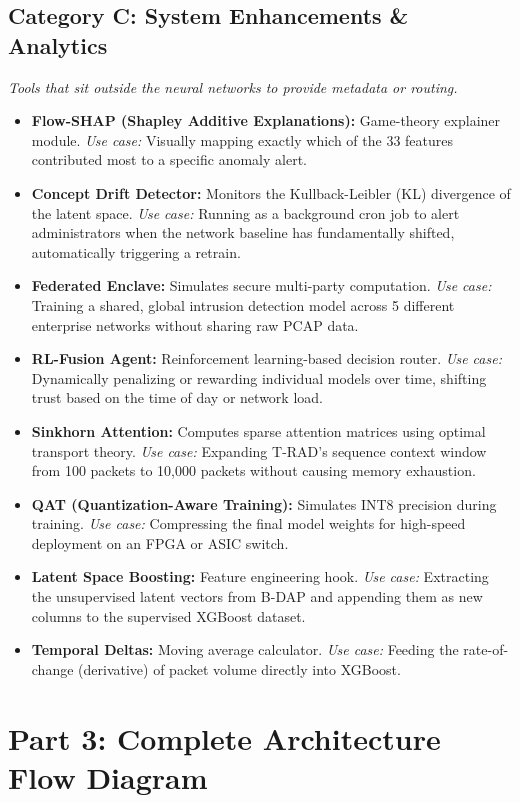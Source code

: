 \documentclass[11pt,a4paper]{article}
\begin{document}
\subsection{Category C: System Enhancements \& Analytics}
\textit{Tools that sit outside the neural networks to provide metadata or routing.}
\begin{itemize}
    \item \textbf{Flow-SHAP (Shapley Additive Explanations):} Game-theory explainer module. \textit{Use case:} Visually mapping exactly which of the 33 features contributed most to a specific anomaly alert.
    \item \textbf{Concept Drift Detector:} Monitors the Kullback-Leibler (KL) divergence of the latent space. \textit{Use case:} Running as a background cron job to alert administrators when the network baseline has fundamentally shifted, automatically triggering a retrain.
    \item \textbf{Federated Enclave:} Simulates secure multi-party computation. \textit{Use case:} Training a shared, global intrusion detection model across 5 different enterprise networks without sharing raw PCAP data.
    \item \textbf{RL-Fusion Agent:} Reinforcement learning-based decision router. \textit{Use case:} Dynamically penalizing or rewarding individual models over time, shifting trust based on the time of day or network load.
    \item \textbf{Sinkhorn Attention:} Computes sparse attention matrices using optimal transport theory. \textit{Use case:} Expanding T-RAD's sequence context window from 100 packets to 10,000 packets without causing memory exhaustion.
    \item \textbf{QAT (Quantization-Aware Training):} Simulates INT8 precision during training. \textit{Use case:} Compressing the final model weights for high-speed deployment on an FPGA or ASIC switch.
    \item \textbf{Latent Space Boosting:} Feature engineering hook. \textit{Use case:} Extracting the unsupervised latent vectors from B-DAP and appending them as new columns to the supervised XGBoost dataset.
    \item \textbf{Temporal Deltas:} Moving average calculator. \textit{Use case:} Feeding the rate-of-change (derivative) of packet volume directly into XGBoost.
\end{itemize}

\newpage
\section{Part 3: Complete Architecture Flow Diagram}
\end{document}
